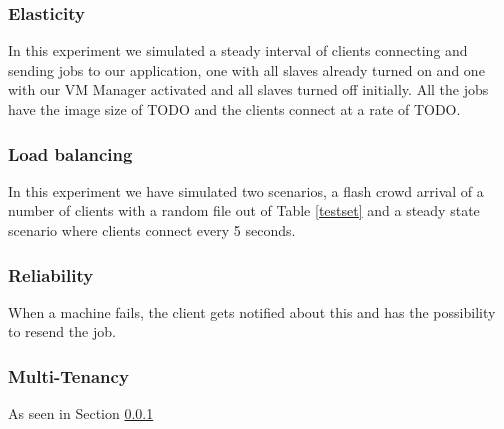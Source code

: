 
\subsubsection{Elasticity}
\label{elastic}
In this experiment we simulated a steady interval of clients connecting and sending jobs to our application, one with all slaves already turned on and one with our VM Manager activated and all slaves turned off initially. All the jobs have the image size of TODO and the clients connect at a rate of TODO.


\subsubsection{Load balancing}
In this experiment we have simulated two scenarios, a flash crowd arrival of a number of clients with a random file out of Table \ref{testset} and a steady state scenario where clients connect every 5 seconds. %

\subsubsection{Reliability}
When a machine fails, the client gets notified about this and has the possibility to resend the job. 

\subsubsection{Multi-Tenancy}
As seen in Section \ref{elastic}
